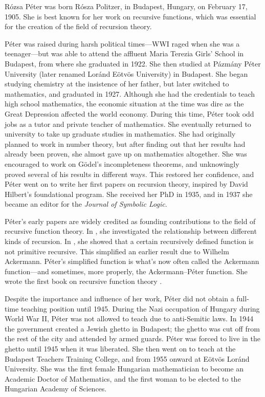 \documentclass[../../../include/open-logic-section]{subfiles}
\begin{document}

 
R\'ozsa P\'eter was born R\'osza Politzer, in Budapest, Hungary, on
February 17, 1905. She is best known for her work on recursive
functions, which was essential for the creation of the field of
recursion theory.

P\'eter was raised during harsh political times---WWI raged when she
was a teenager---but was able to attend the affluent Maria Terezia
Girls' School in Budapest, from where she graduated in 1922.  She then
studied at P\'azm\'any P\'eter University (later renamed Lor\'and
E\"otv\"os University) in Budapest. She began studying chemistry at
the insistence of her father, but later switched to mathematics, and
graduated in 1927. Although she had the credentials to teach high
school mathematics, the economic situation at the time was dire as the
Great Depression affected the world economy. During this time, P\'eter
took odd jobs as a tutor and private teacher of mathematics. She
eventually returned to university to take up graduate studies in
mathematics.  She had originally planned to work in number theory, but
after finding out that her results had already been proven, she almost
gave up on mathematics altogether. She was encouraged to work on
G\"odel's incompleteness theorems, and unknowingly proved several of
his results in different ways. This restored her confidence, and
P\'eter went on to write her first papers on recursion theory,
inspired by David Hilbert's foundational program. She received her PhD
in 1935, and in 1937 she became an editor for the \emph{Journal of
  Symbolic Logic}.

P\'eter's early papers are widely credited as founding contributions
to the field of recursive function theory. In \cite{Peter1935a}, she
investigated the relationship between different kinds of recursion.
In \cite{Peter1935b}, she showed that a certain recursively defined
function is not primitive recursive. This simplified an earlier result
due to Wilhelm Ackermann. P\'eter's simplified function is what's now
often called the Ackermann function---and sometimes, more properly,
the Ackermann--P\'eter function. She wrote the first book on recursive
function theory \cite{Peter1951}.

Despite the importance and influence of her work, P\'eter did not
obtain a full-time teaching position until 1945. During the Nazi
occupation of Hungary during World War II, P\'eter was not allowed to
teach due to anti-Semitic laws. In 1944 the government created a
Jewish ghetto in Budapest; the ghetto was cut off from the rest of the
city and attended by armed guards. P\'eter was forced to live in the
ghetto until 1945 when it was liberated. She then went on to teach at
the Budapest Teachers Training College, and from 1955 onward at E\"otv\"os
Lor\'and University. She was the first female Hungarian mathematician
to become an Academic Doctor of Mathematics, and the first woman to be
elected to the Hungarian Academy of Sciences.
\end{document}
